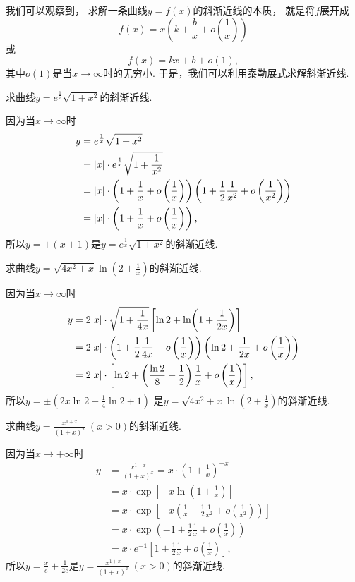 我们可以观察到，
求解一条曲线\(y = f(x)\)的斜渐近线的本质，
就是将\(f\)展开成\[
	f(x) = x \left( k + \frac{b}{x} + o\left(\frac1x\right) \right)
\]或\[
	f(x) = k x + b + o(1),
\]
其中\(o(1)\)是当\(x\to\infty\)时的无穷小.
于是，我们可以利用泰勒展式求解斜渐近线.

\begin{example}
求曲线\(y = e^{\frac1x} \sqrt{1+x^2}\)的斜渐近线.
\begin{solution}
因为当\(x\to\infty\)时\begin{align*}
	y &= e^{\frac1x} \sqrt{1+x^2} \\
	&= \abs{x} \cdot e^{\frac1x} \sqrt{1+\frac1{x^2}} \\
	&= \abs{x} \cdot \left( 1 + \frac1x + o\left(\frac1x\right) \right)
	\left( 1 + \frac12 \frac1{x^2} + o\left(\frac1{x^2}\right) \right) \\
	&= \abs{x} \cdot \left( 1 + \frac1x + o\left(\frac1x\right) \right),
\end{align*}
所以\(y = \pm(x + 1)\)是\(y = e^{\frac1x} \sqrt{1+x^2}\)的斜渐近线.
\end{solution}
\end{example}
\begin{example}
求曲线\(y = \sqrt{4x^2+x} \ln(2+\frac1x)\)的斜渐近线.
\begin{solution}
因为当\(x\to\infty\)时\begin{align*}
	y &= 2 \abs{x} \cdot \sqrt{1 + \frac1{4x}} \left[ \ln2 + \ln(1+\frac1{2x}) \right] \\
	&= 2 \abs{x} \cdot \left( 1 + \frac12 \frac1{4x} + o\left(\frac1x\right) \right)
	\left( \ln 2 + \frac1{2x} + o\left(\frac1x\right) \right) \\
	&= 2 \abs{x} \cdot \left[ \ln2 + \left( \frac{\ln2}8 + \frac12 \right) \frac1x + o\left(\frac1x\right) \right],
\end{align*}
所以\(y = \pm\left( 2x\ln2 + \frac14 \ln2 + 1 \right)\)
是\(y = \sqrt{4x^2+x} \ln(2+\frac1x)\)的斜渐近线.
\end{solution}
\end{example}
\begin{example}
求曲线\(y = \frac{x^{1+x}}{(1+x)^x}\ (x>0)\)的斜渐近线.
\begin{solution}
因为当\(x\to+\infty\)时\begin{align*}
	y &= \frac{x^{1+x}}{(1+x)^x}
	= x \cdot \left( 1 + \frac1x \right)^{-x} \\
	&= x \cdot \exp[-x \ln(1 + \frac1x)] \\
	&= x \cdot \exp[-x \left( \frac1x - \frac12 \frac1{x^2} + o\left(\frac1{x^2}\right) \right)] \\
	&= x \cdot \exp\left( -1 + \frac12 \frac1x + o\left(\frac1x\right) \right) \\
	&= x \cdot e^{-1} \left[ 1 + \frac12 \frac1x + o\left(\frac1x\right) \right],
\end{align*}
所以\(y = \frac{x}{e} + \frac1{2e}\)是\(y = \frac{x^{1+x}}{(1+x)^x}\ (x>0)\)的斜渐近线.
\end{solution}
\end{example}

